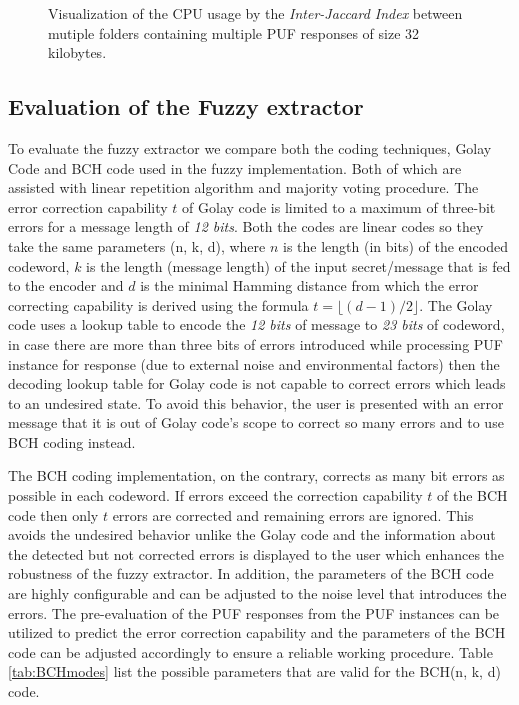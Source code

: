 \newpage
\clearpage

\begin{figure}[t!]
\centering
{}
\caption{Visualization of the CPU usage by the \emph{Inter-Jaccard Index} between mutiple folders containing multiple PUF responses of size 32 kilobytes.}
\label{img:cpu_inter}
\end{figure}

\subsection{Evaluation of the Fuzzy extractor}

To evaluate the fuzzy extractor we compare both the coding techniques, Golay Code and BCH code used in the fuzzy implementation. Both of which are assisted with linear repetition algorithm and majority voting procedure. The error correction capability $t$ of Golay code is limited to a maximum of three-bit errors for a message length of \emph{12 bits}. Both the codes are linear codes so they take the same parameters (n, k, d), where $n$ is the length (in bits) of the encoded codeword, $k$ is the
length (message length) of the input secret/message that is fed to the encoder and $d$ is the minimal Hamming distance from which the error correcting capability is derived using the formula $t = \lfloor(d-1)/2\rfloor$. The Golay code uses a lookup table to encode the \emph{12 bits} of message to \emph{23 bits} of codeword, in case there are more than three bits of errors introduced while processing PUF instance for response (due to external noise and environmental factors) then the decoding lookup
table for Golay code is not capable to correct errors which leads to an undesired state. To avoid this behavior, the user is presented with an error message that it is out of Golay code's scope to correct so many errors and to use BCH coding instead.

The BCH coding implementation, on the contrary, corrects as many bit errors as possible in each codeword. If errors exceed the correction capability $t$ of the BCH code then only $t$ errors are corrected and remaining errors are ignored. This avoids the undesired behavior unlike the Golay code and the information about the detected but not corrected errors is displayed to the user which enhances the robustness of the fuzzy extractor. In addition, the parameters of the BCH code are
highly configurable and can be adjusted to the noise level that introduces the errors. The pre-evaluation of the PUF responses from the PUF instances can be utilized to predict the error correction capability and the parameters of the BCH code can be adjusted accordingly to ensure a reliable working procedure. Table \ref{tab:BCHmodes} list the possible parameters that are valid for the BCH(n, k, d) code.\\


